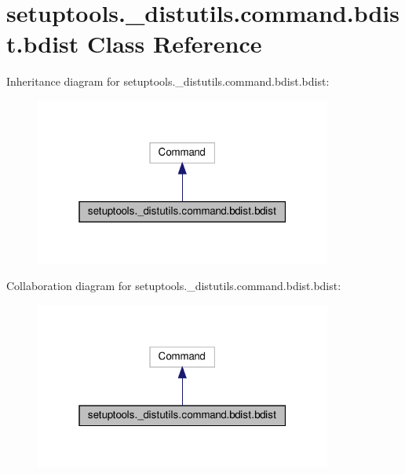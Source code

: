 \hypertarget{classsetuptools_1_1__distutils_1_1command_1_1bdist_1_1bdist}{}\section{setuptools.\+\_\+distutils.\+command.\+bdist.\+bdist Class Reference}
\label{classsetuptools_1_1__distutils_1_1command_1_1bdist_1_1bdist}


Inheritance diagram for setuptools.\+\_\+distutils.\+command.\+bdist.\+bdist\+:
\nopagebreak
\begin{figure}[H]
\begin{center}
\leavevmode
\includegraphics[width=277pt]{classsetuptools_1_1__distutils_1_1command_1_1bdist_1_1bdist__inherit__graph}
\end{center}
\end{figure}


Collaboration diagram for setuptools.\+\_\+distutils.\+command.\+bdist.\+bdist\+:
\nopagebreak
\begin{figure}[H]
\begin{center}
\leavevmode
\includegraphics[width=277pt]{classsetuptools_1_1__distutils_1_1command_1_1bdist_1_1bdist__coll__graph}
\end{center}
\end{figure}
